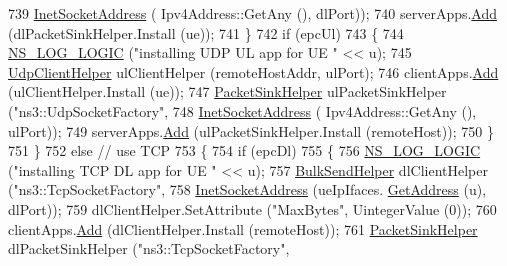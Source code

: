 \begin{DoxyCode}
739                                                            \hyperlink{classns3_1_1InetSocketAddress}{InetSocketAddress} (
      Ipv4Address::GetAny (), dlPort));
740                       serverApps.\hyperlink{classns3_1_1ApplicationContainer_ad09ab1a1ad5849d518d5f4c262e38152}{Add} (dlPacketSinkHelper.Install (ue));
741                     \}
742                   \textcolor{keywordflow}{if} (epcUl)
743                     \{
744                       \hyperlink{group__logging_ga88acd260151caf2db9c0fc84997f45ce}{NS\_LOG\_LOGIC} (\textcolor{stringliteral}{"installing UDP UL app for UE "} << u);
745                       \hyperlink{classns3_1_1UdpClientHelper}{UdpClientHelper} ulClientHelper (remoteHostAddr, ulPort);
746                       clientApps.\hyperlink{classns3_1_1ApplicationContainer_ad09ab1a1ad5849d518d5f4c262e38152}{Add} (ulClientHelper.Install (ue));
747                       \hyperlink{classns3_1_1PacketSinkHelper}{PacketSinkHelper} ulPacketSinkHelper (\textcolor{stringliteral}{"ns3::UdpSocketFactory"}, 
748                                                            \hyperlink{classns3_1_1InetSocketAddress}{InetSocketAddress} (
      Ipv4Address::GetAny (), ulPort));
749                       serverApps.\hyperlink{classns3_1_1ApplicationContainer_ad09ab1a1ad5849d518d5f4c262e38152}{Add} (ulPacketSinkHelper.Install (remoteHost));
750                     \}
751                 \}
752               \textcolor{keywordflow}{else} \textcolor{comment}{// use TCP}
753                 \{
754                   \textcolor{keywordflow}{if} (epcDl)
755                     \{
756                       \hyperlink{group__logging_ga88acd260151caf2db9c0fc84997f45ce}{NS\_LOG\_LOGIC} (\textcolor{stringliteral}{"installing TCP DL app for UE "} << u);
757                       \hyperlink{classns3_1_1BulkSendHelper}{BulkSendHelper} dlClientHelper (\textcolor{stringliteral}{"ns3::TcpSocketFactory"},
758                                                      \hyperlink{classns3_1_1InetSocketAddress}{InetSocketAddress} (ueIpIfaces.
      \hyperlink{classns3_1_1Ipv4InterfaceContainer_ae63208dcd222be986822937ee4aa828c}{GetAddress} (u), dlPort));
759                       dlClientHelper.SetAttribute (\textcolor{stringliteral}{"MaxBytes"}, UintegerValue (0));
760                       clientApps.\hyperlink{classns3_1_1ApplicationContainer_ad09ab1a1ad5849d518d5f4c262e38152}{Add} (dlClientHelper.Install (remoteHost));
761                       \hyperlink{classns3_1_1PacketSinkHelper}{PacketSinkHelper} dlPacketSinkHelper (\textcolor{stringliteral}{"ns3::TcpSocketFactory"}, 

\end{DoxyCode}
